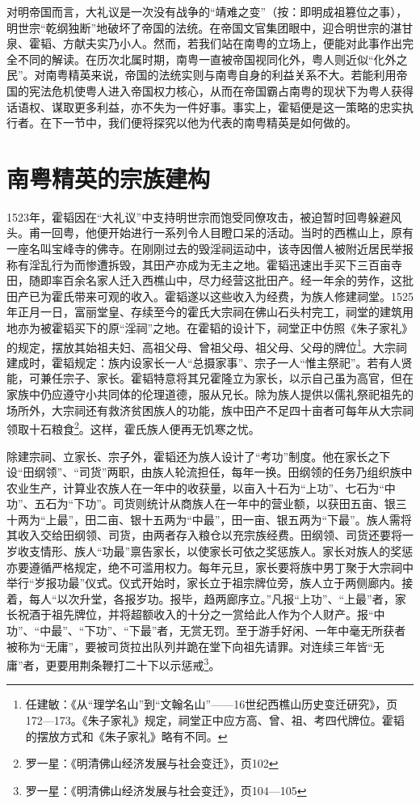 对明帝国而言，大礼议是一次没有战争的“靖难之变”（按：即明成祖篡位之事），明世宗“乾纲独断”地破坏了帝国的法统。在帝国文官集团眼中，迎合明世宗的湛甘泉、霍韬、方献夫实乃小人。然而，若我们站在南粤的立场上，便能对此事作出完全不同的解读。在历次北属时期，南粤一直被帝国视同化外，粤人则近似“化外之民”。对南粤精英来说，帝国的法统实则与南粤自身的利益关系不大。若能利用帝国的宪法危机使粤人进入帝国权力核心，从而在帝国霸占南粤的现状下为粤人获得话语权、谋取更多利益，亦不失为一件好事。事实上，霍韬便是这一策略的忠实执行者。在下一节中，我们便将探究以他为代表的南粤精英是如何做的。

\section{南粤精英的宗族建构}

\indent 1523年，霍韬因在“大礼议”中支持明世宗而饱受同僚攻击，被迫暂时回粤躲避风头。甫一回粤，他便开始进行一系列令人目瞪口呆的活动。当时的西樵山上，原有一座名叫宝峰寺的佛寺。在刚刚过去的毁淫祠运动中，该寺因僧人被附近居民举报称有淫乱行为而惨遭拆毁，其田产亦成为无主之地。霍韬迅速出手买下三百亩寺田，随即率百余名家人迁入西樵山中，尽力经营这批田产。经一年余的劳作，这批田产已为霍氏带来可观的收入。霍韬遂以这些收入为经费，为族人修建祠堂。1525年正月一日，富丽堂皇、存续至今的霍氏大宗祠在佛山石头村完工，祠堂的建筑用地亦为被霍韬买下的原“淫祠”之地。在霍韬的设计下，祠堂正中仿照《朱子家礼》的规定，摆放其始祖夫妇、高祖父母、曾祖父母、祖父母、父母的牌位\footnote{任建敏：《从“理学名山”到“文翰名山”——16世纪西樵山历史变迁研究》，页172—173。《朱子家礼》规定，祠堂正中应方高、曾、祖、考四代牌位。霍韬的摆放方式和《朱子家礼》略有不同。}。大宗祠建成时，霍韬规定：族内设家长一人“总摄家事”、宗子一人“惟主祭祀”。若有人贤能，可兼任宗子、家长。霍韬特意将其兄霍隆立为家长，以示自己虽为高官，但在家族中仍应遵守小共同体的伦理道德，服从兄长。除为族人提供以儒礼祭祀祖先的场所外，大宗祠还有救济贫困族人的功能，族中田产不足四十亩者可每年从大宗祠领取十石粮食\footnote{罗一星：《明清佛山经济发展与社会变迁》，页102}。这样，霍氏族人便再无饥寒之忧。

除建宗祠、立家长、宗子外，霍韬还为族人设计了“考功”制度。他在家长之下设“田纲领”、“司货”两职，由族人轮流担任，每年一换。田纲领的任务乃组织族中农业生产，计算业农族人在一年中的收获量，以亩入十石为“上功”、七石为“中功”、五石为“下功”。司货则统计从商族人在一年中的营业额，以获田五亩、银三十两为“上最”，田二亩、银十五两为“中最”，田一亩、银五两为“下最”。族人需将其收入交给田纲领、司货，由两者存入粮仓以充宗族经费。田纲领、司货还要将一岁收支情形、族人“功最”禀告家长，以使家长可依之奖惩族人。家长对族人的奖惩亦要遵循严格规定，绝不可滥用权力。每年元旦，家长要将族中男丁聚于大宗祠中举行“岁报功最”仪式。仪式开始时，家长立于祖宗牌位旁，族人立于两侧廊内。接着，每人“以次升堂，各报岁功。报毕，趋两廊序立。”凡报“上功”、“上最”者，家长祝酒于祖先牌位，并将超额收入的十分之一赏给此人作为个人财产。报“中功”、“中最”、“下功”、“下最”者，无赏无罚。至于游手好闲、一年中毫无所获者被称为“无庸”，要被司货拉出队列并跪在堂下向祖先请罪。对连续三年皆“无庸”者，更要用荆条鞭打二十下以示惩戒\footnote{罗一星：《明清佛山经济发展与社会变迁》，页104—105}。

